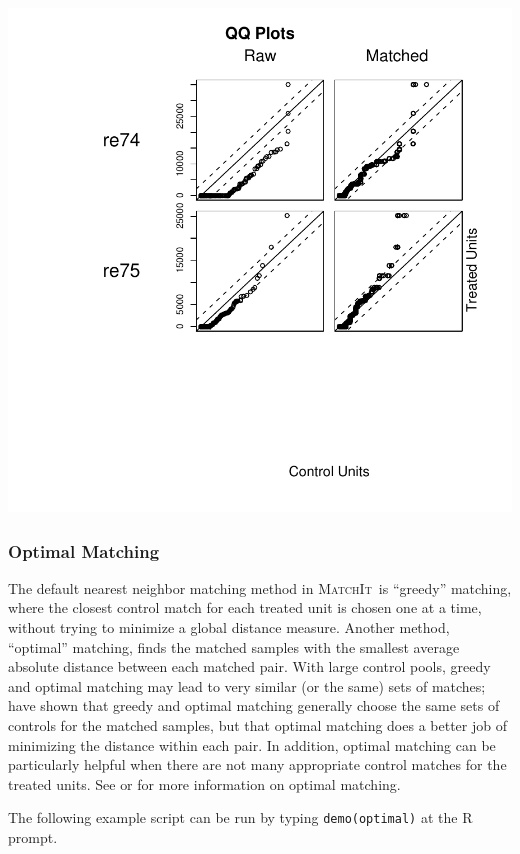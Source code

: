 \documentclass[oneside,letterpaper,titlepage]{article}
\newcommand{\MatchIt}{\textsc{MatchIt}}
\begin{document}
\includegraphics[scale=0.5]{figs/full3}


\subsubsection{Optimal Matching}
\label{subsubsec:optimal}

The default nearest neighbor matching method in \MatchIt\ is
``greedy'' matching, where the closest control match for each treated
unit is chosen one at a time, without trying to minimize a global
distance measure.  Another method, ``optimal'' matching, finds the
matched samples with the smallest average absolute distance between
each matched pair.  With large control pools, greedy and optimal
matching may lead to very similar (or the same) sets of matches;
\citet{GuRos93} have shown that greedy and optimal matching generally
choose the same sets of controls for the matched samples, but that
optimal matching does a better job of minimizing the distance within
each pair.  In addition, optimal matching can be particularly helpful
when there are not many appropriate control matches for the treated
units.  See \cite{GuRos93} or \cite{Rosenbaum02} for more information
on optimal matching.

The following example script can be run by typing {\tt demo(optimal)}
at the R prompt.
\end{document}
